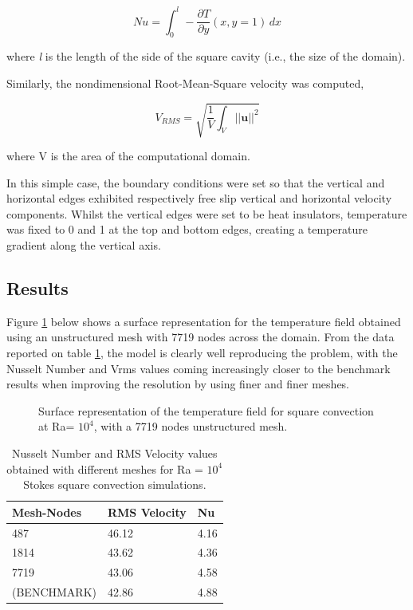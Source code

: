 \begin{equation}
Nu = \int_0^{\textit{l}} \! -\frac{\partial T}{\partial y} (x,y=1) \, dx
\end{equation}

where \textit{l} is the length of the side of the square cavity (i.e., the size of the domain).

Similarly, the nondimensional Root-Mean-Square velocity was computed,

\begin{equation}
V_{RMS} = \sqrt{\frac{1}{V} \int_V ||\textbf{u}||^2 }
\end{equation}

where V is the area of the computational domain.

In this simple case, the boundary conditions were set so that the vertical and horizontal edges exhibited respectively free slip vertical and horizontal velocity components. Whilst the vertical edges were set to be heat insulators, temperature was fixed to 0 and 1 at the top and bottom edges, creating a temperature gradient along the vertical axis.

\subsection{Results}

Figure \ref{Stokessquareconv1} below shows a surface representation for the temperature field obtained using an unstructured mesh with 7719 nodes across the domain. From the data reported on table \ref{Stokessquareconv2}, the model is clearly well reproducing the problem, with the Nusselt Number and Vrms values coming increasingly closer to the benchmark results when improving the resolution by using finer and finer meshes.

\begin{figure}[h!]
  \label{Stokessquareconv1}
  \centering
  \caption{Surface representation of the temperature field for square convection at Ra= $10^4$, with a 7719 nodes unstructured mesh.}
\end{figure}

\begin{table}[h!]
\centering
\begin{tabular}{lll}
\hline
\textbf{Mesh-Nodes} & \textbf{RMS Velocity} & \textbf{Nu} \\
\hline
487 & 46.12 & 4.16 \\
\hline
1814 & 43.62 & 4.36 \\ 
\hline
7719 & 43.06 & 4.58 \\
\hline
(BENCHMARK) & 42.86 & 4.88 \\
\hline
\end{tabular}
\label{Stokessquareconv2}
\caption{Nusselt Number and RMS Velocity values obtained with different meshes for Ra = $10^4$ Stokes square convection simulations.}
\end{table}


